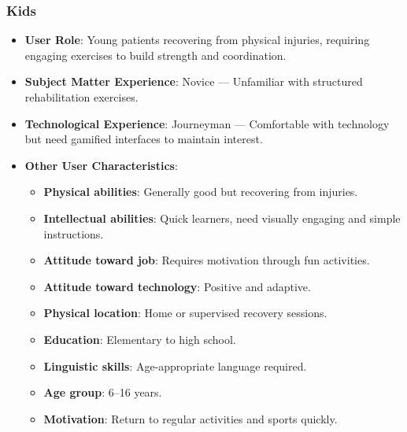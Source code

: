     \subsubsection{Kids}
        \begin{itemize}
            \item \textbf{User Role}: Young patients recovering from physical injuries, requiring engaging exercises to build strength and coordination.
            \item \textbf{Subject Matter Experience}: Novice --- Unfamiliar with structured rehabilitation exercises.
            \item \textbf{Technological Experience}: Journeyman --- Comfortable with technology but need gamified interfaces to maintain interest.
            \item \textbf{Other User Characteristics}:
            \begin{itemize}
                \item \textbf{Physical abilities}: Generally good but recovering from injuries.
                \item \textbf{Intellectual abilities}: Quick learners, need visually engaging and simple instructions.
                \item \textbf{Attitude toward job}: Requires motivation through fun activities.
                \item \textbf{Attitude toward technology}: Positive and adaptive.
                \item \textbf{Physical location}: Home or supervised recovery sessions.
                \item \textbf{Education}: Elementary to high school.
                \item \textbf{Linguistic skills}: Age-appropriate language required.
                \item \textbf{Age group}: 6--16 years.
                \item \textbf{Motivation}: Return to regular activities and sports quickly.
            \end{itemize}
        \end{itemize}

